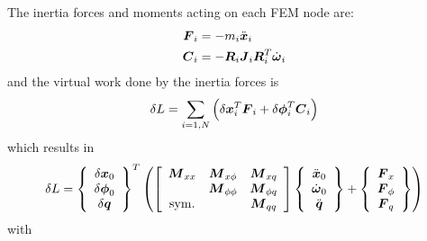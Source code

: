 The inertia forces and moments acting on each FEM node are:
\begin{align}
	\T{F}_i &= - m_i \ddot{\T{x}}_i \\
	\T{C}_i &= - \T{R}_i \T{J}_i \T{R}_i^T \dot{\T{\omega}}_i
\end{align}
and the virtual work done by the inertia forces is
\begin{equation}
	\delta{L} = \sum_{i=1,N} \plbr{
		\delta{\T{x}}_i^T \T{F}_i
		+ \delta\T{\phi}_i^T \T{C}_i
	}
\end{equation}
which results in
\begin{equation}
	\delta{L} = \cubr{\cvvect{
		\delta\T{x}_0 \\
		\delta\T{\phi}_0 \\
		\delta\T{q}
	}}^T \plbr{
	\sqbr{\matr{ccc}{
		\T{M}_{xx} & \T{M}_{x\phi} & \T{M}_{xq} \\
			& \T{M}_{\phi\phi} & \T{M}_{\phi q} \\
		\llk{sym.} & & \T{M}_{qq}
	}} \cubr{\cvvect{
		\ddot{\T{x}}_0 \\
		\dot{\T{\omega}}_0 \\
		\ddot{\T{q}}
	}} + \cubr{\cvvect{
		\T{F}_x \\
		\T{F}_{\phi} \\
		\T{F}_q
	}}
	}
\end{equation}
with
